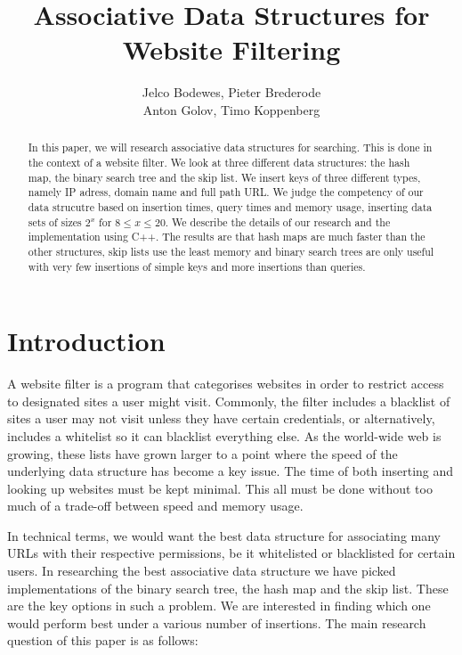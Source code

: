 \documentclass[12pt,a4paper]{article}
\title{Associative Data Structures for Website Filtering}
\author{Jelco Bodewes, Pieter Brederode \\ Anton Golov, Timo Koppenberg }
\begin{document}
    \maketitle

    \begin{abstract}
        In this paper, we will research associative data structures for searching. This is done in the context of
        a website filter. We look at three different data structures: the hash map, the binary search tree
        and the skip list. We insert keys of three different types, namely IP adress, domain name and
        full path URL. We judge the competency of our data strucutre based on insertion times, query times
        and memory usage, inserting data sets of sizes $2^x$ for $8 \le x \le 20$. We describe the details
        of our research and the implementation using C++. The results are that hash maps are much faster
        than the other structures, skip lists use the least memory and binary search trees are
        only useful with very few insertions of simple keys and more insertions than queries.
    \end{abstract}


    \section{Introduction}
    A website filter is a program that categorises websites in order to restrict access to designated
    sites a user might visit. Commonly, the filter includes a blacklist of sites a user may not visit
    unless they have certain credentials, or alternatively, includes a whitelist so it can blacklist
    everything else. As the world-wide web is growing, these lists have grown larger to a point where
    the speed of the underlying data structure has become a key issue. The time of both inserting and
    looking up websites must be kept minimal. This all must be done without too much of a trade-off
    between speed and memory usage.
    
    In technical terms, we would want the best data structure for associating many URLs with their
    respective permissions, be it whitelisted or blacklisted for certain users. In researching the best
    associative data structure we have picked implementations of the binary search tree, the hash map
    and the skip list. These are the key options in such a problem. We are interested in finding which
    one would perform best under a various number of insertions. The main research question of this paper
    is as follows:
    
\end{document}
